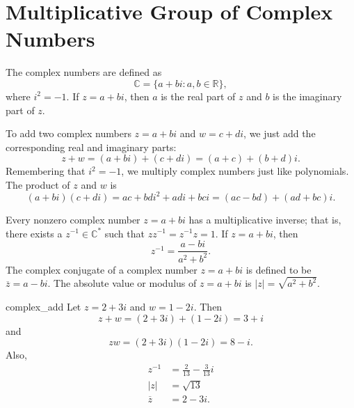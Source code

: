  

\section{Multiplicative Group of Complex Numbers}
 
 
The {\bfi complex numbers} are defined as
\[
{\mathbb C} = \{ a + bi : a, b \in {\mathbb R} \},
\]
where $i^2 = -1$.  If $z=a+bi$, then $a$ is the {\bfi real part} of $z$
and $b$ is the {\bfi imaginary part} of $z$. 
 
 
To add two complex numbers $z=a+bi$ and $w= c+di$, we just
add the corresponding real and imaginary parts:
\[
z+w=(a + bi ) + (c + di)  =  (a+c) + (b+d)i.
\]
Remembering that $i^2 = -1$,  we multiply complex numbers just like
polynomials. The product of $z$ and $w$ is 
\[
(a + bi )(c + di)  =   ac + bdi^2 + adi + bci =  (ac -bd) +
(ad + bc)i.
\]
 
 
Every nonzero complex number $z = a +bi$ has a multiplicative inverse;
that is, there exists a $z^{-1} \in {\mathbb C}^\ast$ such that $z z^{-1}
= z^{-1} z = 1$. If $z = a + bi$, then 
\[
z^{-1} = \frac{a-bi}{ a^2 + b^2  }.
\]
The {\bfi complex conjugate} of a complex
number $z = a +bi$ is defined to be $\overline{z} = a-bi$.  The {\bfi
absolute value} or {\bfi modulus} of  $z = a +bi$  is $|z| =
\sqrt{a^2+b^2}$.  
 
 
\begin{example}{complex_add}
Let $z = 2 + 3i$ and $w = 1-2i$. Then
\[
z + w = (2 + 3i)+( 1-2i ) = 3 +i
\]
and
\[
z  w = (2 + 3i)( 1-2i ) = 8-i.
\]
Also,
\begin{align*}
z^{-1} & = \frac{2}{13} - \frac{3}{13}i \\
|z| & = \sqrt{13} \\
\overline{z} & = 2-3i.
\end{align*}
\end{example}
 
